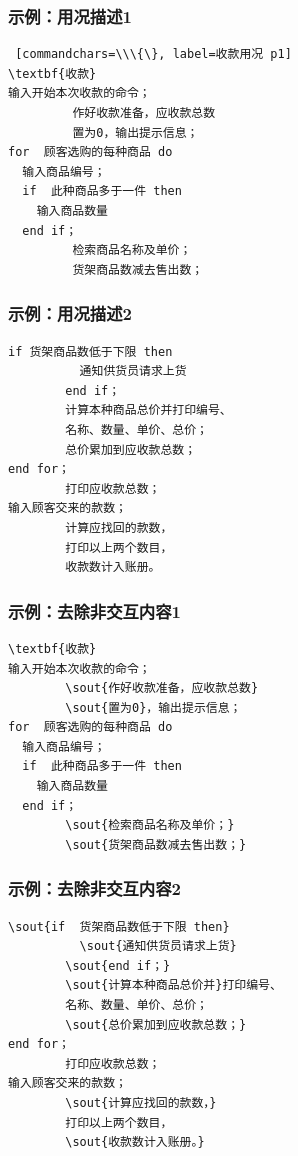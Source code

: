 \documentclass[compress]{beamer}
\begin{document}
\begin{frame}[fragile]
  \frametitle{示例：用况描述1}
\renewcommand\baselinestretch{1.3}
\begin{Verbatim} [commandchars=\\\{\}, label=收款用况 p1]
\textbf{收款}
输入开始本次收款的命令；
         作好收款准备，应收款总数
         置为0，输出提示信息；
for  顾客选购的每种商品 do
  输入商品编号；
  if  此种商品多于一件 then
    输入商品数量
  end if；
         检索商品名称及单价；
         货架商品数减去售出数；
\end{Verbatim}
\end{frame}

\begin{frame}[fragile]
  \frametitle{示例：用况描述2}
\renewcommand\baselinestretch{1.3}
\begin{Verbatim}[firstnumber=last, commandchars=\\\{\}, label=收款用况 p2]
        if 货架商品数低于下限 then
          通知供货员请求上货
        end if；
        计算本种商品总价并打印编号、
        名称、数量、单价、总价；
        总价累加到应收款总数；
end for；
        打印应收款总数；
输入顾客交来的款数；
        计算应找回的款数，
        打印以上两个数目，
        收款数计入账册。
\end{Verbatim}
\end{frame}

\begin{frame}[fragile]
  \frametitle{示例：去除非交互内容1}
\renewcommand\baselinestretch{1.3}
\begin{Verbatim}[commandchars=\\\{\}, label=收款用况 p1]
\textbf{收款}
输入开始本次收款的命令；
        \sout{作好收款准备，应收款总数}
        \sout{置为0}，输出提示信息；
for  顾客选购的每种商品 do
  输入商品编号；
  if  此种商品多于一件 then
    输入商品数量
  end if；
        \sout{检索商品名称及单价；}
        \sout{货架商品数减去售出数；}
\end{Verbatim}
\end{frame}

\begin{frame}[fragile]
  \frametitle{示例：去除非交互内容2}
\renewcommand\baselinestretch{1.3}
\begin{Verbatim}[firstnumber=last, commandchars=\\\{\}, label=收款用况 p2]
        \sout{if  货架商品数低于下限 then}
          \sout{通知供货员请求上货}
        \sout{end if；}
        \sout{计算本种商品总价并}打印编号、
        名称、数量、单价、总价；
        \sout{总价累加到应收款总数；}
end for；
        打印应收款总数；
输入顾客交来的款数；
        \sout{计算应找回的款数，}
        打印以上两个数目，
        \sout{收款数计入账册。}
\end{Verbatim}
\end{frame}
\end{document}
